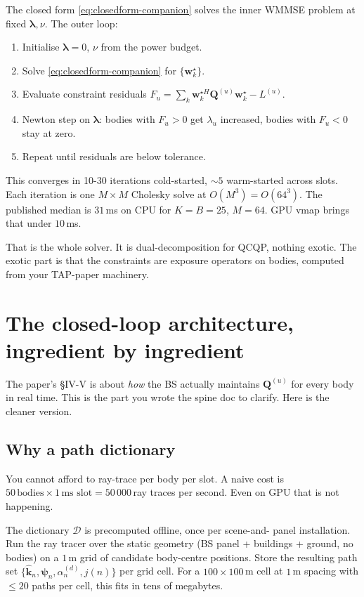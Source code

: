 \documentclass[11pt]{article}
\newcommand{\khat}{\hat{\bm{k}}}
\newcommand{\ww}{\mathbf{w}}
\newcommand{\Qmat}{\mathbf{Q}}
\begin{document}
The closed form \eqref{eq:closedform-companion} solves the inner
WMMSE problem at fixed $\bm\lambda, \nu$. The outer loop:
\begin{enumerate}[leftmargin=1.6em,itemsep=2pt]
  \item Initialise $\bm\lambda = 0$, $\nu$ from the power budget.
  \item Solve \eqref{eq:closedform-companion} for $\{\ww_k^\star\}$.
  \item Evaluate constraint residuals $F_u = \sum_k \ww_k^{\star H}
  \Qmat^{(u)} \ww_k^\star - L^{(u)}$.
  \item Newton step on $\bm\lambda$: bodies with $F_u > 0$ get
  $\lambda_u$ increased, bodies with $F_u < 0$ stay at zero.
  \item Repeat until residuals are below tolerance.
\end{enumerate}
This converges in 10-30 iterations cold-started, $\sim 5$ warm-started
across slots. Each iteration is one $M \times M$ Cholesky solve at
$O(M^3) = O(64^3)$. The published median is $31\,$ms on CPU for
$K=B=25$, $M=64$. GPU vmap brings that under $10\,$ms.

That is the whole solver. It is dual-decomposition for QCQP, nothing
exotic. The exotic part is that the constraints are exposure operators
on bodies, computed from your TAP-paper machinery.

\section{The closed-loop architecture, ingredient by ingredient}

The paper's §IV-V is about \emph{how} the BS actually maintains
$\Qmat^{(u)}$ for every body in real time. This is the part you wrote
the spine doc to clarify. Here is the cleaner version.

\subsection{Why a path dictionary}

You cannot afford to ray-trace per body per slot. A naive cost is
$50\,\text{bodies} \times 1\,\text{ms slot} = 50\,000\,$ray traces per
second. Even on GPU that is not happening.

The dictionary $\mathcal{D}$ is precomputed offline, once per scene-and-
panel installation. Run the ray tracer over the static geometry
(BS panel + buildings + ground, no bodies) on a $1\,$m grid of
candidate body-centre positions. Store the resulting path set
$\{\khat_n, \bm\psi_n, \alpha_n^{(d)}, j(n)\}$ per grid cell. For a
$100 \times 100\,$m cell at $1\,$m spacing with $\leq 20$ paths per
cell, this fits in tens of megabytes.
\end{document}

